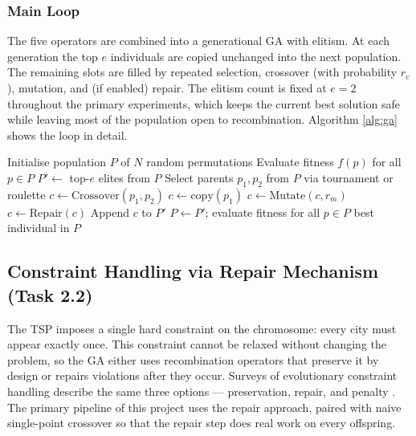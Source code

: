 \subsubsection{Main Loop}
The five operators are combined into a generational GA with elitism.
At each generation the top $e$ individuals are copied unchanged into the
next population. The remaining slots are filled by repeated selection,
crossover (with probability $r_c$), mutation, and (if enabled) repair.
The elitism count is fixed at $e = 2$ throughout the primary experiments,
which keeps the current best solution safe while leaving most of the
population open to recombination. Algorithm \ref{alg:ga} shows the loop
in detail.

\begin{algorithm}[h]
\caption{Generational GA with Optional Repair}
\label{alg:ga}
\begin{algorithmic}[1]
\State Initialise population $P$ of $N$ random permutations
\State Evaluate fitness $f(p)$ for all $p \in P$
    \State $P' \gets$ top-$e$ elites from $P$ 
        \State Select parents $p_1, p_2$ from $P$ via tournament or roulette
            \State $c \gets \mathrm{Crossover}(p_1, p_2)$ 
        \Else
            \State $c \gets \mathrm{copy}(p_1)$
        \EndIf
        \State $c \gets \mathrm{Mutate}(c, r_m)$ 
            \State $c \gets \mathrm{Repair}(c)$
        \EndIf
        \State Append $c$ to $P'$
    \EndWhile
    \State $P \gets P'$; evaluate fitness for all $p \in P$
\EndFor
\State \Return best individual in $P$
\end{algorithmic}
\end{algorithm}

\subsection{Constraint Handling via Repair Mechanism (Task 2.2)}
\label{T2:Repair}

The TSP imposes a single hard constraint on the chromosome: every city
must appear exactly once. This constraint cannot be relaxed without
changing the problem, so the GA either uses recombination operators that
preserve it by design or repairs violations after they occur.
Surveys of evolutionary constraint handling describe the same three
options --- preservation, repair, and penalty
\cite{coello2002constraint,michalewicz1996evolutionary}. The primary
pipeline of this project uses the repair approach, paired with naive
single-point crossover so that the repair step does real work on every
offspring.

